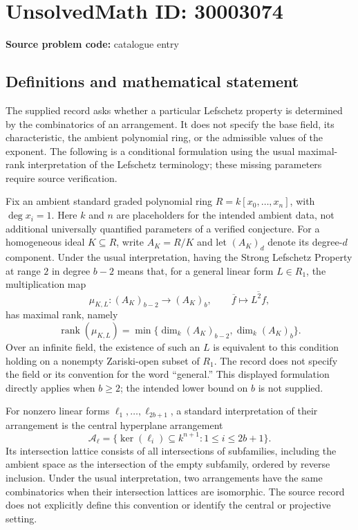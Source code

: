\documentclass[11pt]{article}
\begin{document}
\section*{UnsolvedMath ID: 30003074}
\textbf{Source problem code:} catalogue entry
\subsection{Definitions and mathematical statement}
The supplied record asks whether a particular Lefschetz property is determined by the combinatorics of an arrangement. It does not specify the base field, its characteristic, the ambient polynomial ring, or the admissible values of the exponent. The following is a conditional formulation using the usual maximal-rank interpretation of the Lefschetz terminology; these missing parameters require source verification.

Fix an ambient standard graded polynomial ring \(R=k[x_0,\ldots,x_n]\), with \(\deg x_i=1\). Here \(k\) and \(n\) are placeholders for the intended ambient data, not additional universally quantified parameters of a verified conjecture. For a homogeneous ideal \(K\subseteq R\), write \(A_K=R/K\) and let \((A_K)_d\) denote its degree-\(d\) component. Under the usual interpretation, having the Strong Lefschetz Property at range \(2\) in degree \(b-2\) means that, for a general linear form \(L\in R_1\), the multiplication map
\[
\mu_{K,L}\colon (A_K)_{b-2}\longrightarrow (A_K)_b,
\qquad \overline f\longmapsto\overline{L^2f},
\]
has maximal rank, namely
\[
\operatorname{rank}(\mu_{K,L})
=\min\{\dim_k(A_K)_{b-2},\dim_k(A_K)_b\}.
\]
Over an infinite field, the existence of such an \(L\) is equivalent to this condition holding on a nonempty Zariski-open subset of \(R_1\). The record does not specify the field or its convention for the word ``general.'' This displayed formulation directly applies when \(b\geq2\); the intended lower bound on \(b\) is not supplied.

For nonzero linear forms \(\ell_1,\ldots,\ell_{2b+1}\), a standard interpretation of their arrangement is the central hyperplane arrangement
\[
\mathcal A_{\ell}=\{\ker(\ell_i)\subseteq k^{n+1}:1\leq i\leq2b+1\}.
\]
Its intersection lattice consists of all intersections of subfamilies, including the ambient space as the intersection of the empty subfamily, ordered by reverse inclusion. Under the usual interpretation, two arrangements have the same combinatorics when their intersection lattices are isomorphic. The source record does not explicitly define this convention or identify the central or projective setting.
\end{document}
